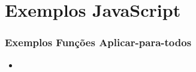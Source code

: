 \section{Exemplos JavaScript}

\begin{frame}
	\frametitle{Exemplos Funções Aplicar-para-todos}
	\begin{itemize}
		\item 
	\end{itemize}
\end{frame}